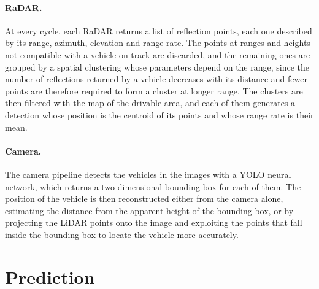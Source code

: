 \paragraph{RaDAR.} At every cycle, each RaDAR returns a list of reflection points, each one
described by its range, azimuth, elevation and range rate. The points at ranges and heights
not compatible with a vehicle on track are discarded, and the remaining ones are grouped by a
spatial clustering whose parameters depend on the range, since the number of reflections
returned by a vehicle decreases with its distance and fewer points are therefore required to
form a cluster at longer range. The clusters are then filtered with the map of the drivable
area, and each of them generates a detection whose position is the centroid of its points and
whose range rate is their mean.

\paragraph{Camera.} The camera pipeline detects the vehicles in the images with a YOLO
neural network, which returns a two-dimensional bounding box for each of them. The position
of the vehicle is then reconstructed either from the camera alone, estimating the distance
from the apparent height of the bounding box, or by projecting
the LiDAR points onto the image and exploiting the points that fall inside the bounding box
to locate the vehicle more accurately.



\section{Prediction}
